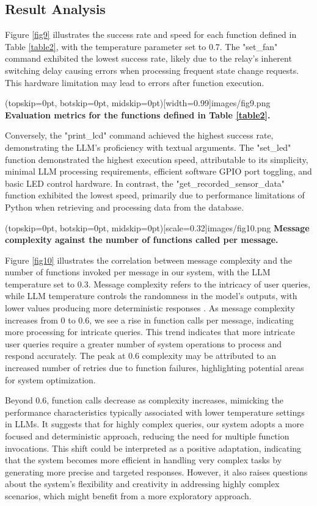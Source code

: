 \documentclass{ieeeaccess}
\begin{document}
\subsection{Result Analysis}
Figure \ref{fig9} illustrates the success rate and speed for each function defined in Table \ref{table2}, with the temperature parameter set to 0.7. The "set\_fan" command exhibited the lowest success rate, likely due to the relay's inherent switching delay causing errors when processing frequent state change requests. This hardware limitation may lead to errors after function execution.  

\Figure[h!](topskip=0pt, botskip=0pt,
midskip=0pt)[width=0.99\columnwidth]{{images/fig9.png}}
{ \textbf{Evaluation metrics for the functions defined in Table \ref{table2}.}\label{fig9}}

Conversely, the "print\_lcd" command achieved the highest success rate, demonstrating the LLM's proficiency with textual arguments. The "set\_led" function demonstrated the highest execution speed, attributable to its simplicity, minimal LLM processing requirements, efficient software GPIO port toggling, and basic LED control hardware. In contrast, the "get\_recorded\_sensor\_data" function exhibited the lowest speed, primarily due to performance limitations of Python when retrieving and processing data from the database.

\Figure[t!](topskip=0pt, botskip=0pt,
midskip=0pt)[scale=0.32]{{images/fig10.png}}
{ \textbf{Message complexity against the number of functions called per message.}\label{fig10}}

Figure \ref{fig10} illustrates the correlation between message complexity and the number of functions invoked per message in our system, with the LLM temperature set to 0.3. Message complexity refers to the intricacy of user queries, while LLM temperature controls the randomness in the model's outputs, with lower values producing more deterministic responses \cite{rum2024setting}. As message complexity increases from 0 to 0.6, we see a rise in function calls per message, indicating more processing for intricate queries. This trend indicates that more intricate user queries require a greater number of system operations to process and respond accurately. The peak at 0.6 complexity may be attributed to an increased number of retries due to function failures, highlighting potential areas for system optimization. 

Beyond 0.6, function calls decrease as complexity increases, mimicking the performance characteristics typically associated with lower temperature settings in LLMs. It suggests that for highly complex queries, our system adopts a more focused and deterministic approach, reducing the need for multiple function invocations. This shift could be interpreted as a positive adaptation, indicating that the system becomes more efficient in handling very complex tasks by generating more precise and targeted responses. However, it also raises questions about the system's flexibility and creativity in addressing highly complex scenarios, which might benefit from a more exploratory approach.
\end{document}
